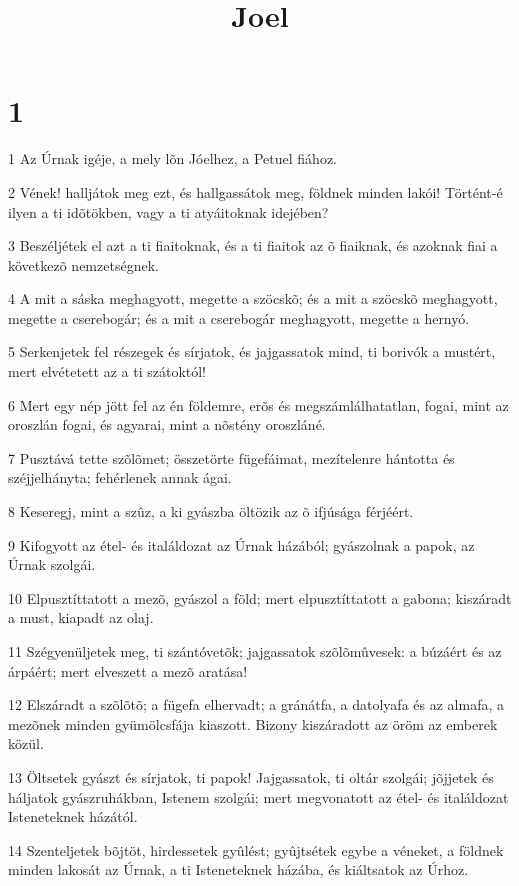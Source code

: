 

\title{Joel}


\chapter{1}

\par 1 Az Úrnak igéje, a mely lõn Jóelhez, a Petuel fiához.
\par 2 Vének! halljátok meg ezt, és hallgassátok meg, földnek minden lakói! Történt-é ilyen a ti idõtökben, vagy a ti atyáitoknak idejében?
\par 3 Beszéljétek el azt a ti fiaitoknak, és a ti fiaitok az õ fiaiknak, és azoknak fiai a következõ nemzetségnek.
\par 4 A mit a sáska meghagyott, megette a szöcskõ; és a mit a szöcskõ meghagyott, megette a cserebogár; és a mit a cserebogár meghagyott, megette a hernyó.
\par 5 Serkenjetek fel részegek és sírjatok, és jajgassatok mind, ti borivók a mustért, mert elvétetett az a ti szátoktól!
\par 6 Mert egy nép jött fel az én földemre, erõs és megszámlálhatatlan, fogai, mint az oroszlán fogai, és agyarai, mint a nõstény oroszláné.
\par 7 Pusztává tette szõlõmet; összetörte fügefáimat, mezítelenre hántotta és széjjelhányta; fehérlenek annak ágai.
\par 8 Keseregj, mint a szûz, a ki gyászba öltözik az õ ifjúsága férjéért.
\par 9 Kifogyott az étel- és italáldozat az Úrnak házából; gyászolnak a papok, az Úrnak szolgái.
\par 10 Elpusztíttatott a mezõ, gyászol a föld; mert elpusztíttatott a gabona; kiszáradt a must, kiapadt az olaj.
\par 11 Szégyenüljetek meg, ti szántóvetõk; jajgassatok szõlõmûvesek: a búzáért és az árpáért; mert elveszett a mezõ aratása!
\par 12 Elszáradt a szõlõtõ; a fügefa elhervadt; a gránátfa, a datolyafa és az almafa, a mezõnek minden gyümölcsfája kiaszott. Bizony kiszáradott az öröm az emberek közül.
\par 13 Öltsetek gyászt és sírjatok, ti papok! Jajgassatok, ti oltár szolgái; jõjjetek és háljatok gyászruhákban, Istenem szolgái; mert megvonatott az étel- és italáldozat Isteneteknek házától.
\par 14 Szenteljetek bõjtöt, hirdessetek gyûlést; gyûjtsétek egybe a véneket, a földnek minden lakosát az Úrnak, a ti Isteneteknek házába, és kiáltsatok az Úrhoz.

